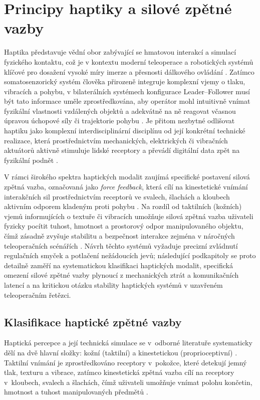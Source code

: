 \documentclass[FZS,DP]{tulthesis}
\begin{document}
\section{Principy haptiky a silové zpětné vazby}
Haptika představuje vědní obor zabývající se hmatovou interakcí a simulací fyzického kontaktu, což je v kontextu moderní teleoperace a robotických systémů klíčové pro dosažení vysoké míry imerze a přesnosti dálkového ovládání \cite{GIUDICI2025, Patel2022}. Zatímco somatosenzorický systém člověka přirozeně integruje komplexní vjemy o tlaku, vibracích a pohybu, v bilaterálních systémech konfigurace Leader–Follower musí být tato informace uměle zprostředkována, aby operátor mohl intuitivně vnímat fyzikální vlastnosti vzdálených objektů a adekvátně na ně reagovat včasnou úpravou úchopové síly či trajektorie pohybu \cite{Patel2022, Thomas2023110, GIUDICI2025}. Je přitom nezbytné odlišovat haptiku jako komplexní interdisciplinární disciplínu od její konkrétní technické realizace, která prostřednictvím mechanických, elektrických či vibračních aktuátorů aktivně stimuluje lidské receptory a převádí digitální data zpět na fyzikální podnět \cite{Yang2025, Li2025, Patel2022}.

V rámci širokého spektra haptických modalit zaujímá specifické postavení silová zpětná vazba, označovaná jako \textit{force feedback}, která cílí na kinestetické vnímání interakčních sil prostřednictvím receptorů ve svalech, šlachách a kloubech aktivním odporem kladeným proti pohybu \cite{Patel2022, Yang2025}. Na rozdíl od taktilních (kožních) vjemů informujících o textuře či vibracích umožňuje silová zpětná vazba uživateli fyzicky pocítit tuhost, hmotnost a prostorový odpor manipulovaného objektu, čímž zásadně zvyšuje stabilitu a bezpečnost interakce zejména v náročných teleoperačních scénářích \cite{GIUDICI2025, Patel2022, Li2025}. Návrh těchto systémů vyžaduje precizní zvládnutí regulačních smyček a potlačení nežádoucích jevů; následující podkapitoly se proto detailně zaměří na systematickou klasifikaci haptických modalit, specifická omezení silové zpětné vazby plynoucí z mechanických ztrát a komunikačních latencí a na kritickou otázku stability haptických systémů v uzavřeném teleoperačním řetězci.
\subsection{Klasifikace haptické zpětné vazby}
Haptická percepce a její technická simulace se v~odborné literatuře systematicky dělí na dvě hlavní složky: kožní (taktilní) a kinestetickou (proprioceptivní) \cite{Yang2025, GIUDICI2025, Li2025}.
Taktilní vnímání je zprostředkováno receptory v~pokožce, které detekují jemný tlak, texturu a vibrace, zatímco kinestetická zpětná vazba cílí na receptory v~kloubech, svalech a šlachách, čímž uživateli umožňuje vnímat polohu končetin, hmotnost a tuhost manipulovaných předmětů \cite{Yang2025, Belcamino2024, DAbbraccio201923}.
\end{document}
